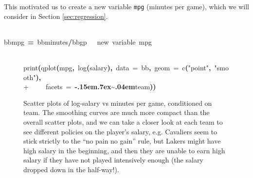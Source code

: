 \documentclass[english]{article}
\newenvironment{dummy}{\par}{\par}
\newcommand{\hlfunctioncall}[1]{\textcolor[rgb]{1,0,0}{#1}}%
\newcommand{\hlstring}[1]{\textcolor[rgb]{0.6,0.6,1}{#1}}%
\newcommand{\hlkeyword}[1]{\textcolor[rgb]{0,0,0}{\textbf{#1}}}%
\newcommand{\hlargument}[1]{\textcolor[rgb]{0.694117647058824,0.247058823529412,0.0196078431372549}{#1}}%
\newcommand{\hlcomment}[1]{\textcolor[rgb]{0.8,0.8,0.8}{#1}}%
\newcommand{\hlassignement}[1]{\textcolor[rgb]{0.215686274509804,0.215686274509804,0.384313725490196}{\textbf{#1}}}%
\newcommand{\hlsymbol}[1]{\textcolor[rgb]{0,0,0}{#1}}%
\newcommand{\hlprompt}[1]{\textcolor[rgb]{0,0,0}{#1}}%
\def\urltilda{\kern -.15em\lower .7ex\hbox{\~{}}\kern .04em}%
\newcommand{\hlstd}[1]{\textcolor[rgb]{0,0,0}{#1}}%
\begin{document}
This motivated us to create a new variable \texttt{mpg} (minutes per
game), which we will consider in Section \ref{sec:regression}.
\begin{dummy}
\hspace*{\fill}\\
\hlstd{}\ttfamily\noindent
\hlprompt{\usebox{\hlnormalsizeboxgreaterthan}{\ }}\hlsymbol{bb}\hlkeyword{\usebox{\hlnormalsizeboxdollar}}\hlsymbol{mpg}{\ }\hlassignement{=}{\ }\hlsymbol{bb}\hlkeyword{\usebox{\hlnormalsizeboxdollar}}\hlsymbol{minutes}\hlkeyword{/}\hlsymbol{bb}\hlkeyword{\usebox{\hlnormalsizeboxdollar}}\hlsymbol{gp}{\ }{\ }{\ }\hlcomment{\usebox{\hlnormalsizeboxhash}{\ }new{\ }variable{\ }\usebox{\hlnormalsizeboxsinglequote}mpg\usebox{\hlnormalsizeboxsinglequote}}\mbox{}
\normalfont
\hspace*{\fill}\\
\hlstd{}
\end{dummy}
%
\begin{figure}
\begin{dummy}
\hspace*{\fill}\\
\hlstd{}\ttfamily\noindent
\hlprompt{\usebox{\hlnormalsizeboxgreaterthan}{\ }}\hlfunctioncall{print}\hlkeyword{(}\hlfunctioncall{qplot}\hlkeyword{(}\hlsymbol{mpg}\hlkeyword{,}{\ }\hlfunctioncall{log}\hlkeyword{(}\hlsymbol{salary}\hlkeyword{)}\hlkeyword{,}{\ }\hlargument{data}{\ }\hlargument{=}{\ }\hlsymbol{bb}\hlkeyword{,}{\ }\hlargument{geom}{\ }\hlargument{=}{\ }\hlfunctioncall{c}\hlkeyword{(}\hlstring{"point"}\hlkeyword{,}{\ }\hlstring{"smooth"}\hlkeyword{)}\hlkeyword{,}\hspace*{\fill}\\
\hlstd{}\hlprompt{+{\ }}{\ }{\ }{\ }{\ }\hlargument{facets}{\ }\hlargument{=}{\ }\hlkeyword{\urltilda{}}\hlsymbol{team}\hlkeyword{)}\hlkeyword{)}\mbox{}
\normalfont
\hspace*{\fill}\\
\hlstd{}
\begin{center}


\endpgfgraphicnamed
\end{center}
\end{dummy}
\caption{Scatter plots of log-salary vs minutes per game, conditioned on team.
The smoothing curves are much more compact than the overall scatter
plots, and we can take a closer look at each team to see different
policies on the player's salary, e.g. Cavaliers seem to stick strictly
to the {}``no pain no gain'' rule, but Lakers might have high salary
in the beginning, and then they are unable to earn high salary if
they have not played intensively enough (the salary dropped down in
the half-way!).\label{fig:salary-team}}

\end{figure}
\end{document}
